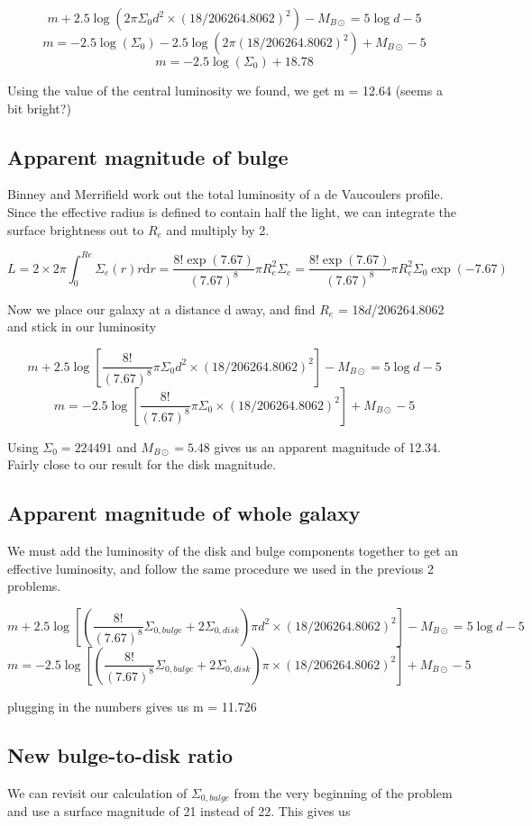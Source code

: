 \documentclass[12pt]{article}
\begin{document}
$$ m  + 2.5\log(2\pi \Sigma_{0}d^2  \times (18/206264.8062)^{2}) - M_{B \odot} = 5\log d - 5 $$
$$ m  = -2.5\log(\Sigma_{0}) - 2.5\log(2\pi (18/206264.8062)^{2}) + M_{B \odot}   - 5 $$
$$ m  = -2.5\log(\Sigma_{0}) + 18.78 $$

Using the value of the central luminosity we found, we get m = 12.64 (seems a bit bright?)

\subsection{Apparent magnitude of bulge}
Binney and Merrifield work out the total luminosity of a de Vaucoulers profile. Since the effective radius is defined to contain half the light, we can integrate the surface brightness out to $R_{e}$ and multiply by 2.

$$L = 2 \times 2\pi \int^{Re}_{0} \Sigma_{e}(r) r \mathrm{d}r = \frac{8! \exp(7.67)}{(7.67)^{8}}\pi R_{e}^{2} \Sigma_{e} =  \frac{8!\exp(7.67)}{(7.67)^{8}}\pi R_{e}^{2} \Sigma_{0}\exp(-7.67)$$

Now we place our galaxy at a distance d away, and find $R_{e}$ = 18$d$/206264.8062 and stick in our luminosity

$$ m  + 2.5\log[\frac{8!}{(7.67)^{8}}\pi \Sigma_{0} d^2  \times (18/206264.8062)^{2}] - M_{B \odot} = 5\log d - 5 $$
$$ m  = - 2.5\log[\frac{8!}{(7.67)^{8}}\pi \Sigma_{0}  \times (18/206264.8062)^{2}] + M_{B \odot}  - 5 $$

Using $\Sigma_{0} = 224491$ and $M_{B \odot} = 5.48$ gives us an apparent magnitude of 12.34. Fairly close to our result for the disk magnitude. 

\subsection{Apparent magnitude of whole galaxy}

We must add the luminosity of the disk and bulge components together to get an effective luminosity, and follow the same procedure we used in the previous 2 problems. 

$$ m  +  2.5\log[(\frac{8!}{(7.67)^{8}} \Sigma_{0,bulge} + 2 \Sigma_{0, disk}) \pi d^2  \times (18/206264.8062)^{2}] - M_{B \odot} = 5\log d - 5 $$
$$ m  = - 2.5\log[(\frac{8!}{(7.67)^{8}} \Sigma_{0,bulge} + 2 \Sigma_{0, disk}) \pi  \times (18/206264.8062)^{2}] + M_{B \odot}  - 5 $$

plugging in the numbers gives us m = 11.726

\subsection{New bulge-to-disk ratio}
We can revisit our calculation of $\Sigma_{0,bulge}$ from the very beginning of the problem and use a surface magnitude of 21 instead of 22. This gives us
\end{document}
